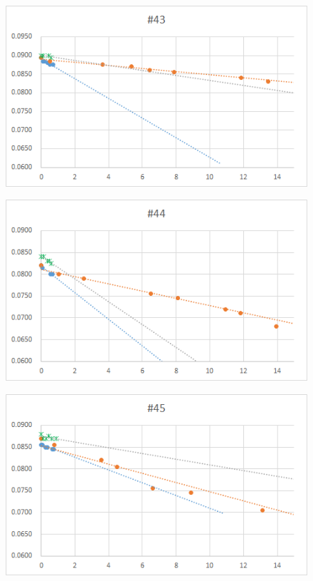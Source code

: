   \begin{figure}[htbp]
    \centering
       \includegraphics[width=120mm]{vol_043.png}
  \end{figure}
  \begin{figure}[htbp]
    \centering
       \includegraphics[width=120mm]{vol_044.png}
  \end{figure}
  \begin{figure}[htbp]
    \centering
       \includegraphics[width=120mm]{vol_045.png}
  \end{figure}
